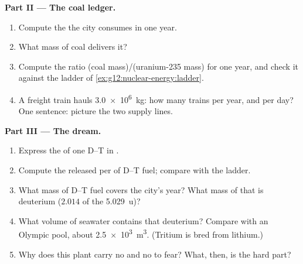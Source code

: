 \begin{problem}
\medskip
\noindent\textbf{Part II --- The coal ledger.}
\begin{enumerate}[resume]
  \item Compute the  the city consumes in one year.
  \item What mass of coal delivers it?
  \item Compute the ratio (coal mass)/(uranium-235 mass) for one year, and
        check it against the ladder of \cref{ex:g12:nuclear-energy:ladder}.
  \item A freight train hauls \qty{3.0e6}{kg}: how many trains per year, and
        per day? One sentence: picture the two supply lines.
\end{enumerate}

\medskip
\noindent\textbf{Part III --- The  dream.}
\begin{enumerate}[resume]
  \item Express the  of one D--T  in .
  \item Compute the  released per  of D--T fuel; compare with
        the ladder.
  \item What mass of D--T fuel covers the city's year? What mass of that is
        deuterium ($2.014$ of the \qty{5.029}{u})?
  \item What volume of seawater contains that deuterium? Compare with an
        Olympic pool, about \qty{2.5e3}{m^3}. (Tritium is bred from lithium.)
  \item Why does this plant carry no  and no  to
        fear? What, then, is the hard part?
\end{enumerate}


\end{problem}
